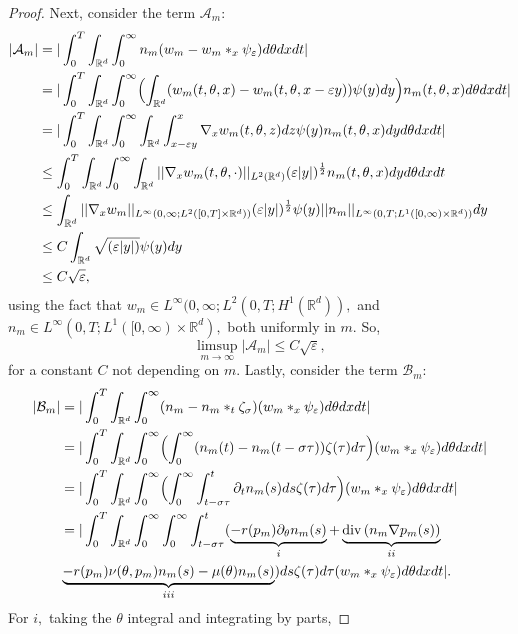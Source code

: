 \documentclass{amsart}
\def\R{\mathbb R}
\def\div{\mathrm{div}\,}
\begin{document}
\begin{proof}
Next, consider the term $\mathcal{A}_m:$
\begin{align*}
|\mathcal{A}_m|&=|\int_{0}^{T}\int_{\R^d}\int_{0}^{\infty}n_m(w_m -w_m*_x \psi_\varepsilon)d\theta dx dt|\\&=|\int_{0}^{T}\int_{\R^d}\int_{0}^{\infty}\Bigl(\int_{\R^d}(w_m(t,\theta,x)-w_m(t,\theta,x-\varepsilon y))\psi(y)dy\Bigr)n_m(t,\theta,x)d\theta dx dt |\\&= |\int_{0}^{T}\int_{\R^d}\int_{0}^{\infty}\int_{\R^d}\int_{x-\varepsilon y}^{x}\nabla_x w_m(t,\theta,z)dz\psi(y)n_m(t,\theta,x) dy d\theta dx dt| \\
& \leq \int_{0}^{T}\int_{\R^d}\int_{0}^{\infty}\int_{\R^d}||\nabla_x w_m(t,\theta,\cdot)||_{L^2(\R^d)}(\varepsilon |y|)^{\frac{1}{2}}n_m(t,\theta,x)dyd\theta dx dt\\
& \leq \int_{\R^d}||\nabla_x w_m||_{L^\infty(0,\infty; L^2([0,T]\times \R^d))}(\varepsilon |y|)^{\frac{1}{2}}\psi(y)||n_m||_{L^\infty(0,T;L^1([0,\infty)\times \R^d))}dy \\
&\leq C\int_{\R^d}\sqrt{(\varepsilon|y|)}\psi(y)dy \\
& \leq C\sqrt{\varepsilon},
\end{align*}
 using the fact that $w_m \in L^\infty(0,\infty;L^2(0,T;H^1(\R^d)),$ and $n_m \in L^\infty(0,T;L^1([0,\infty)\times \R^d),$ both uniformly in $m$. So, 
 $$\limsup_{m\rightarrow \infty}|\mathcal{A}_m|\leq C\sqrt{\varepsilon},$$
 for a constant $C$ not depending on $m$.
Lastly, consider the term $\mathcal{B}_m:$
\begin{align*}
|\mathcal{B}_m|&=|\int_{0}^{T}\int_{\R^d}\int_{0}^{\infty}(n_m-n_m *_t \zeta_\sigma)(w_m *_x \psi_\varepsilon) d\theta dx dt| \\&= |\int_{0}^{T}\int_{\R^d}\int_{0}^{\infty}\Bigl(\int_{0}^{\infty}(n_m(t)-n_m(t-\sigma \tau) )\zeta(\tau)d\tau\Bigr)(w_m *_x \psi_\varepsilon) d\theta dx dt|\\
 &= |\int_{0}^{T}\int_{\R^d}\int_{0}^{\infty}\Bigl(\int_{0}^{\infty}\int_{t-\sigma \tau}^{t}\partial_t n_m(s)ds\zeta(\tau)d\tau\Bigr)(w_m *_x \psi_\varepsilon) d\theta dx dt| \\
 &= |\int_{0}^{T}\int_{\R^d}\int_{0}^{\infty}\int_{0}^{\infty}\int_{t-\sigma \tau}^{t}(\underbrace{-r(p_m)\partial_\theta n_m (s)}_{i}+\underbrace{\div(n_m \nabla p_m(s))}_{ii}\\&\underbrace{-r(p_m)\nu(\theta,p_m)n_m(s)-\mu(\theta)n_m(s)}_{iii})ds \zeta(\tau)d\tau (w_m*_x \psi_\varepsilon)d\theta dx dt|.
\end{align*}
For $i,$ taking the $\theta$ integral and integrating by parts,

\end{proof}
\end{document}
